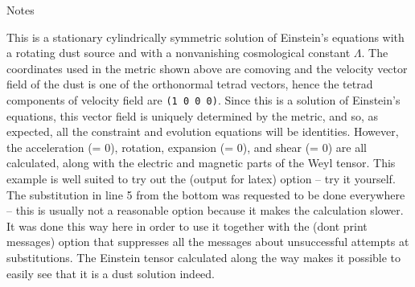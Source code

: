 \bigskip

\centerline{Notes}

This is a stationary cylindrically symmetric solution of Einstein's equations
with a rotating dust source and with a nonvanishing cosmological constant
$\Lambda$. The coordinates used in the metric shown above are comoving and the
velocity vector field of the dust is one of the orthonormal tetrad vectors,
hence the tetrad components of velocity field are \verb+(1 0 0 0)+. Since this
is a solution of Einstein's equations, this vector field is uniquely determined
by the metric, and so, as expected, all the constraint and evolution equations
will be identities. However, the acceleration (= 0), rotation, expansion (= 0),
and shear (= 0) are all calculated, along with the electric and magnetic parts
of the Weyl tensor. This example is well suited to try out the (output for
latex) option -- try it yourself. The substitution in line 5 from the bottom
was requested to be done everywhere -- this is usually not a reasonable option
because it makes the calculation slower. It was done this way here in order to
use it together with the (dont print messages) option that suppresses all the
messages about unsuccessful attempts at substitutions. The Einstein tensor
calculated along the way makes it possible to easily see that it is a dust
solution indeed.

\bigskip

